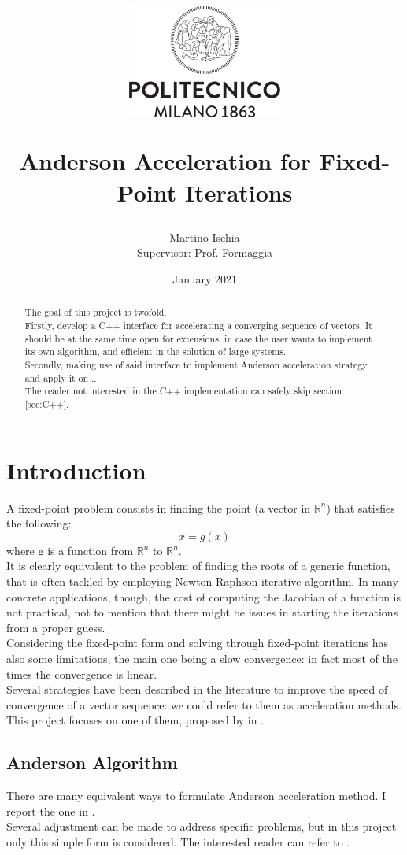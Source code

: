 \documentclass[12pt]{article}
\title
		{
		\vspace{-30mm}\begin{figure}[h]
		\centering
		\includegraphics[width=2in]{./Include/logo_polimi.png}
		\end{figure}
		Anderson Acceleration for Fixed-Point Iterations
		}
\author{Martino Ischia\\ \footnotesize{Supervisor: Prof. Formaggia}}
\date{January 2021}
\begin{document}
		\maketitle
		\begin{abstract}
			\noindent The goal of this project is twofold.\\
			Firstly, develop a C++ interface for accelerating a converging sequence of vectors.
			It should be at the same time open for extensions, in case the user wants to implement its own algorithm,
			and efficient in the solution of large systems.\\
			Secondly, making use of said interface to implement Anderson acceleration strategy and apply it on ...\\
			The reader not interested in the C++ implementation can safely skip section \ref{sec:C++}.
		\end{abstract}
		\tableofcontents
		\pagebreak
		
		
		\section{Introduction}
			A fixed-point problem consists in finding the point (a vector in $\mathbb{R}^n$) that satisfies the
			following:
			\begin{equation}
			x = g(x)
			\label{eq:g}
			\end{equation}
			where g is a function from $\mathbb{R}^n$ to $\mathbb{R}^n$.\\
			It is clearly equivalent to the problem of finding the roots of a generic function,
			that is often tackled by employing Newton-Raphson iterative algorithm.
			In many concrete applications, though, the cost of computing the Jacobian of a function
			is not practical, not to mention that there might be issues in starting the
			iterations from a proper guess.\\
			Considering the fixed-point form and solving through fixed-point iterations has also some limitations, the main one being
			a slow convergence: in fact most of the times the convergence is linear.\\
			Several strategies have been described in the literature to improve the speed
			of convergence of a vector sequence: we could refer to them as acceleration methods.
			This project focuses on one of them,
			proposed by \citeauthor{Anderson} \cite{Anderson} in \citeyear{Anderson}.
			
			\subsection{Anderson Algorithm}
				There are many equivalent ways to formulate Anderson acceleration method.
				I report the one in \citeauthor{Walker} \cite{Walker}.\\
				Several adjustment can be made to address specific problems, but in this
				project only this simple form is considered. The interested reader can
				refer to \cite{Fang} \cite{Walker}.
				
\end{document}
